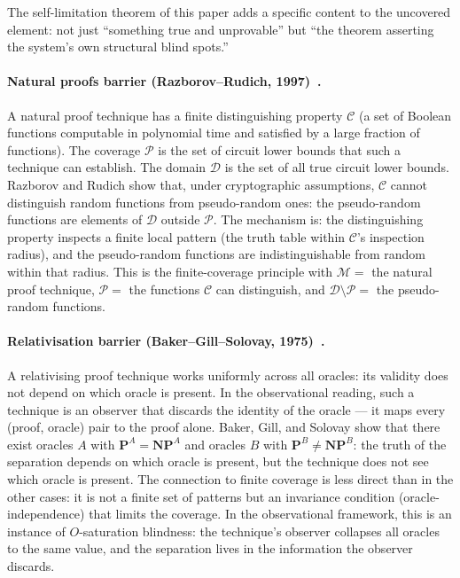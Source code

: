 \documentclass[11pt]{article}
\begin{document}
The self-limitation theorem of this paper adds a specific content to the
uncovered element: not just ``something true and unprovable'' but ``the
theorem asserting the system's own structural blind spots.''

\paragraph{Natural proofs barrier (Razborov--Rudich,
1997)~\cite{razborov1997}.}
A natural proof technique has a finite distinguishing property
$\mathcal{C}$ (a set of Boolean functions computable in polynomial time
and satisfied by a large fraction of functions). The coverage
$\mathcal{P}$ is the set of circuit lower bounds that such a technique
can establish. The domain $\mathcal{D}$ is the set of all true circuit
lower bounds. Razborov and Rudich show that, under cryptographic
assumptions, $\mathcal{C}$ cannot distinguish random functions from
pseudo-random ones: the pseudo-random functions are elements of
$\mathcal{D}$ outside $\mathcal{P}$. The mechanism is: the
distinguishing property inspects a finite local pattern (the truth table
within $\mathcal{C}$'s inspection radius), and the pseudo-random
functions are indistinguishable from random within that radius. This is
the finite-coverage principle with $\mathcal{M} = $ the natural proof
technique, $\mathcal{P} = $ the functions $\mathcal{C}$ can distinguish,
and $\mathcal{D} \setminus \mathcal{P} = $ the pseudo-random functions.

\paragraph{Relativisation barrier (Baker--Gill--Solovay,
1975)~\cite{baker1975}.}
A relativising proof technique works uniformly across all oracles: its
validity does not depend on which oracle is present. In the
observational reading, such a technique is an observer that discards the
identity of the oracle --- it maps every (proof, oracle) pair to the
proof alone. Baker, Gill, and Solovay show that there exist oracles $A$
with $\mathbf{P}^A = \mathbf{NP}^A$ and oracles $B$ with
$\mathbf{P}^B \neq \mathbf{NP}^B$: the truth of the separation depends
on which oracle is present, but the technique does not see which oracle
is present. The connection to finite coverage is less direct than in
the other cases: it is not a finite set of patterns but an invariance
condition (oracle-independence) that limits the coverage. In the
observational framework, this is an instance of $O$-saturation
blindness: the technique's observer collapses all oracles to the same
value, and the separation lives in the information the observer
discards.
\end{document}
